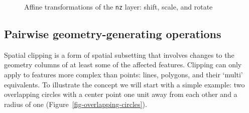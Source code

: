 \documentclass[
  letterpaper,
]{krantz}
\begin{document}
\begin{figure}

\begin{minipage}{0.33\linewidth}



\end{minipage}%
%
\begin{minipage}{0.33\linewidth}



\end{minipage}%
%
\begin{minipage}{0.33\linewidth}



\end{minipage}%

\caption{\label{fig-affine-transformations}Affine transformations of the
\texttt{nz} layer: shift, scale, and rotate}

\end{figure}%

\subsection{Pairwise geometry-generating operations}\label{sec-clipping}

Spatial clipping is a form of spatial subsetting that involves changes
to the geometry columns of at least some of the affected features.
Clipping can only apply to features more complex than points: lines,
polygons, and their `multi' equivalents. To illustrate the concept we
will start with a simple example: two overlapping circles with a center
point one unit away from each other and a radius of one
(Figure~\ref{fig-overlapping-circles}).
\end{document}
